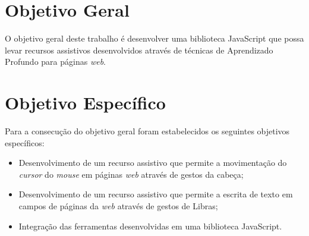 






\section{Objetivo Geral}

\par O objetivo geral deste trabalho é desenvolver uma biblioteca JavaScript que possa levar recursos assistivos desenvolvidos através de técnicas de Aprendizado Profundo para páginas \textit{web}.


\section{Objetivo Espec\'ifico}

\par Para a consecução do objetivo geral foram estabelecidos os seguintes objetivos específicos:

\begin{itemize}
    \item Desenvolvimento de um recurso assistivo que permite a movimentação do \textit{cursor} do \textit{mouse} em páginas \textit{web} através de gestos da cabeça;
    \item Desenvolvimento de um recurso assistivo que permite a escrita de texto em campos de páginas da \textit{web} através de gestos de Libras;
    \item Integração das ferramentas desenvolvidas em uma biblioteca JavaScript.
\end{itemize}

